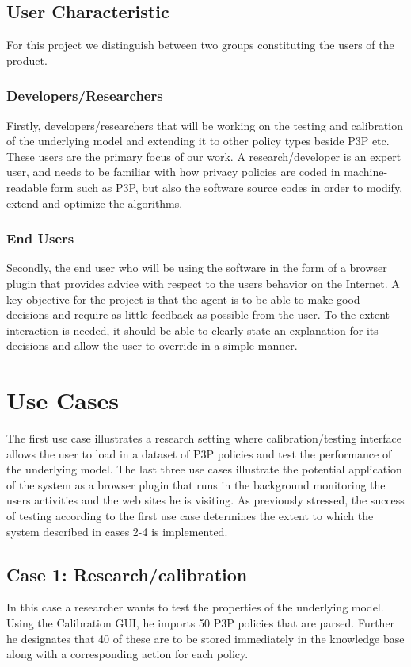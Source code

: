 \subsection{User Characteristic}

For this project we distinguish between two groups constituting the users of the product. 
\subsubsection{Developers/Researchers}
Firstly, developers/researchers that will be working on the testing and calibration of the underlying model and extending it to other policy types beside P3P etc. These users are the primary focus of our work. A research/developer is an expert user, and needs to be familiar with how privacy policies are coded in machine-readable form such as P3P, but also the software source codes in order to modify, extend and optimize the algorithms. 

\subsubsection{End Users}
Secondly, the end user who will be using the software in the form of a browser plugin that provides advice with respect to the users behavior on the Internet. A key objective for the project is that the agent is to be able to make good decisions and require as little feedback as possible from the user. To the extent interaction is needed, it should be able to clearly state an explanation for its decisions and allow the user to override in a simple manner.


\section{Use Cases}\label{useCase}

The first use case illustrates a research setting where calibration/testing interface allows the user to load in a dataset of P3P policies and test the performance of the underlying model. The last three use cases illustrate the potential application of the system as a browser plugin that runs in the background monitoring the users activities and the web sites he is visiting. As previously stressed, the success of testing according to the first use case determines the extent to which the system described in cases 2-4 is implemented.

\subsection*{Case 1: Research/calibration}
In this case a researcher wants to test the properties of the underlying model. Using the Calibration GUI, he imports 50 P3P policies that are parsed. Further he designates that 40 of these are to be stored immediately in the knowledge base along with a corresponding action for each policy.

